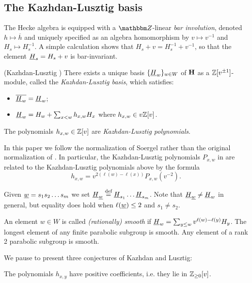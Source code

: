 \subsection{The Kazhdan-Lusztig basis}
\label{subsec-KLbasis}

The Hecke algebra is equipped with a $\Z$-linear \emph{bar involution}, denoted $h \mapsto \overline{h}$ and
uniquely specified as an algebra homomorphism by $v \mapsto v^{-1}$ and $H_s \mapsto H_s^{-1}$. A simple
calculation shows that $H_s + v = H_s^{-1}+v^{-1}$, so that the element $\underline{H}_s = H_s+v$ is bar-invariant.

\begin{thm}(Kazhdan-Lusztig \cite{KaL1}) There exists a unique basis $\{\underline{H}_w\}_{w \in W}$ of ${\mathbf H}$ as a ${\mathbb{Z}}[v^{\pm 1}]$-module, called the \emph{Kazhdan-Lusztig basis}, which satisfies:
\begin{itemize}
\item $\overline{\underline{H}_w}=\underline{H}_w$;
\item $\underline{H}_w = H_w + \sum_{x < w} h_{x,w} H_x$ where $h_{x,w} \in v{\mathbb{Z}}[v]$.\end{itemize}
\end{thm}

The polynomials $h_{x,w} \in {\mathbb{Z}}[v]$ are \emph{Kazhdan-Lusztig polynomials}. 

\begin{remark} In this paper we follow the normalization of Soergel \cite{Soe4} rather than the original normalization of \cite{KaL1}. In particular, the Kazhdan-Lusztig polynomials $P_{x,w}$ in \cite{KaL1} are related to the Kazhdan-Lusztig polynomials above by the formula
\[
h_{x,w} = v^{2(\ell(w) - \ell(x))}P_{x,w}(v^{-2}).
\]
\end{remark}

Given $\underline{w} = s_1s_2 \dots s_m$ we set $\underline{H}_{\underline{w}} \stackrel{\mbox{\scriptsize{def}}}{=} \underline{H}_{s_1} \dots \underline{H}_{s_m}$. Note that $\underline{H}_{\underline{w}} \ne \underline{H}_w$ in general, but equality does hold when $\ell(\underline{w}) \le 2$ and $s_1 \ne s_2$.

An element $w \in W$ is called \emph{(rationally) smooth} if $\underline{H}_w = \sum_{y \le w} v^{\ell(w) -\ell(y)}H_y$. The longest element of any finite parabolic subgroup is smooth. Any
element of a rank 2 parabolic subgroup is smooth.

We pause to present three conjectures of Kazhdan and Lusztig:

\begin{conj} The polynomials $h_{x,y}$ have positive coefficients, i.e. they lie in ${\mathbb{Z}}_{\ge 0}[v]$. \end{conj}

